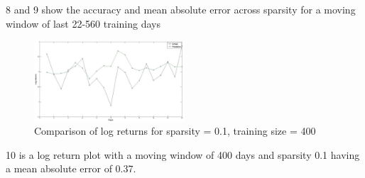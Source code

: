 \figurename{8} and \figurename{9} show the accuracy and mean absolute error across sparsity for a moving window of last 22-560 training days

\begin{figure}[h!]
	\includegraphics[width=0.5\textwidth]{results/prediction.jpg}
	\caption{Comparison of log returns for sparsity = 0.1, training size = 400}
\end{figure}

\figurename{10} is a log return plot with a moving window of 400 days and sparsity 0.1 having a mean absolute error of 0.37.



